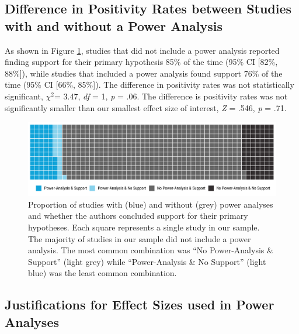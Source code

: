 \documentclass[
  man, donotrepeattitle,mask,floatsintext]{apa7}
\begin{document}
\hypertarget{difference-in-positivity-rates-between-studies-with-and-without-a-power-analysis}{%
\subsection{Difference in Positivity Rates between Studies with and without a Power Analysis}\label{difference-in-positivity-rates-between-studies-with-and-without-a-power-analysis}}

As shown in Figure \ref{fig:fig2}, studies that did not include a power analysis reported finding support for their primary hypothesis 85\% of the time (95\% CI {[}82\%, 88\%{]}), while studies that included a power analysis found support 76\% of the time (95\% CI {[}66\%, 85\%{]}). The difference in positivity rates was not statistically significant, \(\chi^2\)= 3.47, \emph{df} = 1, \emph{p} = .06. The difference is positivity rates was not significantly smaller than our smallest effect size of interest, \emph{Z} = .546, \emph{p} = .71.

\pagebreak

\begin{figure}

{\centering \includegraphics{../../figs/fig2} 

}

\caption{Proportion of studies with (blue) and without (grey) power analyses and whether the authors concluded support for their primary hypotheses. Each square represents a single study in our sample. The majority of studies in our sample did not include a power analysis. The most common combination was ``No Power-Analysis \& Support'' (light grey) while ``Power-Analysis \& No Support'' (light blue) was the least common combination.}\label{fig:fig2}
\end{figure}



\pagebreak

\hypertarget{justifications-for-effect-sizes-used-in-power-analyses}{%
\subsection{Justifications for Effect Sizes used in Power Analyses}\label{justifications-for-effect-sizes-used-in-power-analyses}}
\end{document}

